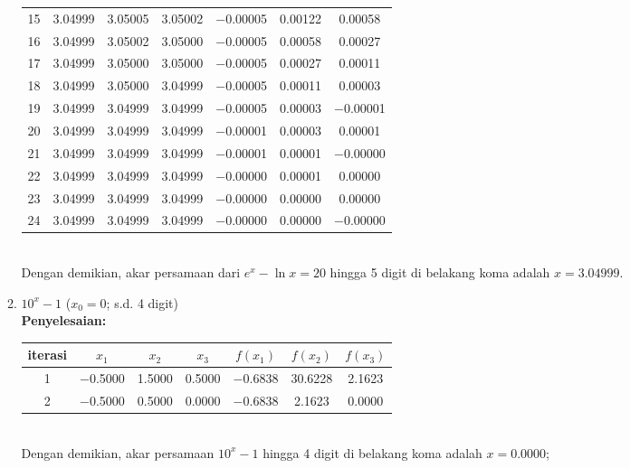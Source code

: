 \documentclass{article}
\newcommand{\penyelesaian}{\textbf{Penyelesaian: }}
\begin{document}
\begin{enumerate}
\begin{enumerate}
\begin{tabular}{|c|c|c|c|c|c|c|}
            15 & \num{3,04999} & \num{3,05005} & \num{3,05002} & \num{-0,00005} & \num{0,00122} & \num{0,00058}\\
            16 & \num{3,04999} & \num{3,05002} & \num{3,05000} & \num{-0,00005} & \num{0,00058} & \num{0,00027}\\
            17 & \num{3,04999} & \num{3,05000} & \num{3,05000} & \num{-0,00005} & \num{0,00027} & \num{0,00011}\\
            18 & \num{3,04999} & \num{3,05000} & \num{3,04999} & \num{-0,00005} & \num{0,00011} & \num{0,00003}\\
            19 & \num{3,04999} & \num{3,04999} & \num{3,04999} & \num{-0,00005} & \num{0,00003} & \num{-0,00001}\\
            20 & \num{3,04999} & \num{3,04999} & \num{3,04999} & \num{-0,00001} & \num{0,00003} & \num{0,00001}\\
            21 & \num{3,04999} & \num{3,04999} & \num{3,04999} & \num{-0,00001} & \num{0,00001} & \num{-0,00000}\\
            22 & \num{3,04999} & \num{3,04999} & \num{3,04999} & \num{-0,00000} & \num{0,00001} & \num{0,00000}\\
            23 & \num{3,04999} & \num{3,04999} & \num{3,04999} & \num{-0,00000} & \num{0,00000} & \num{0,00000}\\
            24 & \num{3,04999} & \num{3,04999} & \num{3,04999} & \num{-0,00000} & \num{0,00000} & \num{-0,00000}\\
             \hline
            \end{tabular} \\           
        Dengan demikian, akar persamaan dari $e^x - \ln{x} = 20$ hingga 5 digit di belakang koma adalah $x = \num{3,04999}$.  

        \item $10^x - 1$ ($x_0 = \num{0}$; s.d. 4 digit) \\ 
        \penyelesaian \\
        \begin{tabular}{|c|c|c|c|c|c|c|}
            \hline
            iterasi & $x_1$ & $x_2$ & $x_3$ & $f(x_1)$ & $f(x_2)$ & $f(x_3)$ \\
            \hline
            1 & \num{-0,5000} & \num{1,5000} & \num{0,5000} & \num{-0,6838} & \num{30,6228} & \num{2,1623}\\
            2 & \num{-0,5000} & \num{0,5000} & \num{0,0000} & \num{-0,6838} & \num{2,1623} & \num{0,0000}\\
             \hline
            \end{tabular} \\
        Dengan demikian, akar persamaan $10^x - 1$ hingga 4 digit di belakang koma adalah $x = \num{0,0000}$;
                        
    \end{enumerate}
\end{enumerate}
\end{document}
